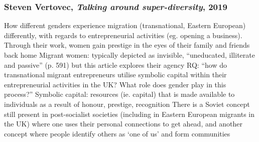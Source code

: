 \documentclass{article}
\begin{document}
\subsubsection{Steven Vertovec, \textit{Talking around super-diversity}, 2019}

\begin{outline}
	\1 How different genders experience migration (transnational, Eastern European) differently, with regards to entrepreneurial activities (eg. opening a business). Through their work, women gain prestige in the eyes of their family and friends back home
	\1 Migrant women: typically depicted as invisible, ``uneducated, illiterate and passive'' (p. 591) but this article explores their agency
	\1 RQ: ``how do transnational migrant entrepreneurs utilise symbolic capital within their entrepreneurial activities in the UK? What role does gender play in this process?''
	\1 Symbolic capital: resources (ie. capital) that is made available to individuals as a result of honour, prestige, recognition
		\2 There is a Soviet concept still present in post-socialist societies (including in Eastern European migrants in the UK) where one uses their personal connections to get ahead, and another concept where people identify others as `one of us' and form communities
\end{outline}
\end{document}
